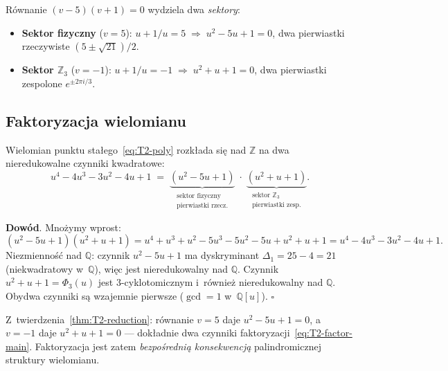 \begin{remark}\label{rem:T2-sectors}
R\'ownanie $(v-5)(v+1)=0$ wydziela dwa \emph{sektory}:
\begin{itemize}
  \item \textbf{Sektor fizyczny} ($v=5$):
        $u + 1/u = 5 \;\Rightarrow\; u^2 - 5u + 1 = 0$,
        dwa pierwiastki rzeczywiste $(5\pm\sqrt{21})/2$.
  \item \textbf{Sektor $\mathbb{Z}_3$} ($v=-1$):
        $u + 1/u = -1 \;\Rightarrow\; u^2 + u + 1 = 0$,
        dwa pierwiastki zespolone $e^{\pm 2\pi i/3}$.
\end{itemize}
\end{remark}


\subsection{Faktoryzacja wielomianu}\label{app:T2-factorization}

\begin{theorem}\label{thm:T2-factor}
Wielomian punktu sta\l{}ego~\eqref{eq:T2-poly} rozk\l{}ada si\k{e}
nad $\mathbb{Z}$ na dwa nieredukowalne czynniki kwadratowe:
\begin{equation}\label{eq:T2-factor-main}
  u^4 - 4u^3 - 3u^2 - 4u + 1
  \;=\;
  \underbrace{(u^2 - 5u + 1)}_{\substack{\text{sektor fizyczny}\\\text{pierwiastki rzecz.}}}
  \;\cdot\;
  \underbrace{(u^2 + u + 1)}_{\substack{\text{sektor }\mathbb{Z}_3\\\text{pierwiastki zesp.}}}.
\end{equation}

\textbf{Dow\'od}.
Mno\.zymy wprost:
\[
  (u^2-5u+1)(u^2+u+1)
  = u^4 + u^3 + u^2 - 5u^3 - 5u^2 - 5u + u^2 + u + 1
  = u^4 - 4u^3 - 3u^2 - 4u + 1.
\]
Niezmienno\'s\'c nad $\mathbb{Q}$: czynnik $u^2-5u+1$ ma dyskryminant
$\Delta_1 = 25-4 = 21$ (niekwadratowy w~$\mathbb{Q}$), wi\k{e}c jest
nieredukowalny nad $\mathbb{Q}$.  Czynnik $u^2+u+1 = \Phi_3(u)$
jest 3-cyklotomicznym i~r\'ownie\.z nieredukowalny nad $\mathbb{Q}$.
Obydwa czynniki s\k{a} wzajemnie pierwsze ($\gcd = 1$ w~$\mathbb{Q}[u]$).
\hfill$\square$
\end{theorem}

\begin{remark}
Z~twierdzenia~\ref{thm:T2-reduction}: r\'ownanie $v=5$ daje
$u^2-5u+1=0$, a~$v=-1$ daje $u^2+u+1=0$ ---
dok\l{}adnie dwa czynniki faktoryzacji~\eqref{eq:T2-factor-main}.
Faktoryzacja jest zatem \emph{bezpo\'sredni\k{a} konsekwencj\k{a}}
palindromicznej struktury wielomianu.
\end{remark}


